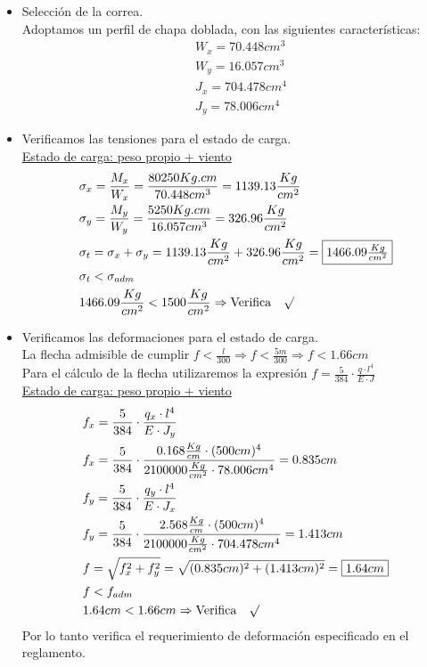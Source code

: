 \begin{enumerate}
\begin{itemize}
\item Selección de la correa.\\
Adoptamos un perfil  de chapa doblada, con las siguientes características:
\begin{align*}
& W_x= 70.448 cm^3 \\
& W_y= 16.057 cm^3 \\
& J_x= 704.478 cm^4 \\
& J_y= 78.006 cm^4
\end{align*}

\item Verificamos las tensiones para el estado de carga.\\
\underline{Estado de carga: peso propio + viento}
\begin{align*}
& \sigma_x=\frac{M_x}{W_x} = \frac{80250 Kg.cm}{70.448 cm^3} = 1139.13 \frac{Kg}{cm^2}\\
& \sigma_y=\frac{M_y}{W_y} = \frac{5250 Kg.cm}{16.057 cm^3} = 326.96 \frac{Kg}{cm^2}\\
& \sigma_t= \sigma_x + \sigma_y = 1139.13 \frac{Kg}{cm^2} + 326.96 \frac{Kg}{cm^2} = \framebox{$ 1466.09 \frac{Kg}{cm^2}$}\\
& \sigma_t < \sigma_{adm}\\
& 1466.09 \frac{Kg}{cm^2} < 1500 \frac{Kg}{cm^2} \Rightarrow \text{Verifica} \quad \surd
\end{align*}

\item Verificamos las deformaciones para el estado de carga.\\
La flecha admisible de cumplir $f < \frac{l}{300} \Rightarrow f < \frac{5m}{300} \Rightarrow f < 1.66cm$\\
Para el cálculo de la flecha utilizaremos la expresión $f= \frac{5}{384} \cdot \frac{q \cdot l^4}{E \cdot J}$\\

\underline{Estado de carga: peso propio + viento}
\begin{align*}
& f_x=\frac{5}{384} \cdot \frac{q_x \cdot l^4}{E \cdot J_y}\\
& f_x=\frac{5}{384} \cdot \frac{0.168 \frac{Kg}{cm} \cdot (500cm)^4}{2100000 \frac{Kg}{cm^2} \cdot 78.006 cm^4} = 0.835cm\\
& f_y=\frac{5}{384} \cdot \frac{q_y \cdot l^4}{E \cdot J_x}\\
& f_y=\frac{5}{384} \cdot \frac{2.568 \frac{Kg}{cm} \cdot (500cm)^4}{2100000 \frac{Kg}{cm^2} \cdot 704.478 cm^4} = 1.413cm\\
& f = \sqrt{f_x^2+f_y^2} = \sqrt{(0.835cm)^2+(1.413cm)^2} = \framebox{$1.64cm$}\\
& f < f_{adm}\\
& 1.64cm < 1.66cm \Rightarrow \text{Verifica} \quad \surd
\end{align*}
Por lo tanto verifica el requerimiento de deformación especificado en el reglamento.\\
\end{itemize}
\end{enumerate}